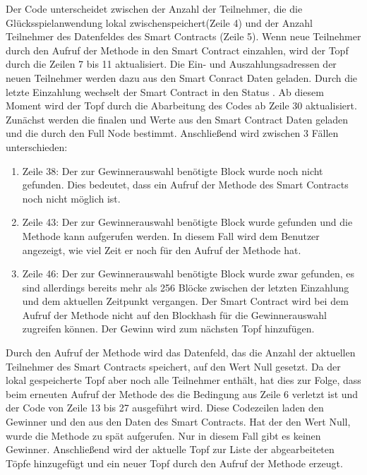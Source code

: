 Der Code unterscheidet zwischen der Anzahl der Teilnehmer, die die Glücksspielanwendung lokal zwischenspeichert(Zeile 4) und der Anzahl Teilnehmer des Datenfeldes des Smart Contracts (Zeile 5). Wenn neue Teilnehmer durch den Aufruf der  Methode in den Smart Contract einzahlen, wird der Topf durch die Zeilen 7 bis 11 aktualisiert. Die Ein- und Auszahlungsadressen der neuen Teilnehmer werden dazu aus den Smart Conract Daten geladen.
Durch die letzte Einzahlung wechselt der Smart Contract in den Status . Ab diesem Moment wird der Topf durch die Abarbeitung des Codes ab Zeile 30 aktualisiert. Zunächst werden die finalen  und  Werte aus den Smart Contract Daten geladen und die  durch den Full Node bestimmt. Anschließend wird zwischen 3 Fällen unterschieden:
\begin{enumerate}
\item Zeile 38: Der zur Gewinnerauswahl benötigte Block wurde noch nicht gefunden. Dies bedeutet, dass ein Aufruf der  Methode des Smart Contracts noch nicht möglich ist.
\item Zeile 43: Der zur Gewinnerauswahl benötigte Block wurde gefunden und die  Methode kann aufgerufen werden. In diesem Fall wird dem Benutzer angezeigt, wie viel Zeit er noch für den Aufruf der  Methode hat. 
\item Zeile 46: Der zur Gewinnerauswahl benötigte Block wurde zwar gefunden, es sind allerdings bereits mehr als 256 Blöcke zwischen der letzten Einzahlung und dem aktuellen Zeitpunkt vergangen. Der Smart Contract wird bei dem Aufruf der  Methode nicht auf den Blockhash für die Gewinnerauswahl zugreifen können. Der Gewinn wird zum nächsten Topf hinzufügen.
\end{enumerate}
Durch den Aufruf der  Methode wird das Datenfeld, das die Anzahl der aktuellen Teilnehmer des Smart Contracts speichert, auf den Wert Null gesetzt. Da der lokal gespeicherte Topf aber noch alle Teilnehmer enthält, hat dies zur Folge, dass beim erneuten Aufruf der  Methode des  die Bedingung aus Zeile 6 verletzt ist und der Code von Zeile 13 bis 27 ausgeführt wird. Diese Codezeilen laden den Gewinner und den  aus den Daten des Smart Contracts. Hat der  den Wert Null, wurde die  Methode zu spät aufgerufen. Nur in diesem Fall gibt es keinen Gewinner. Anschließend wird der aktuelle Topf zur Liste der abgearbeiteten Töpfe hinzugefügt und ein neuer Topf durch den Aufruf der  Methode erzeugt.

